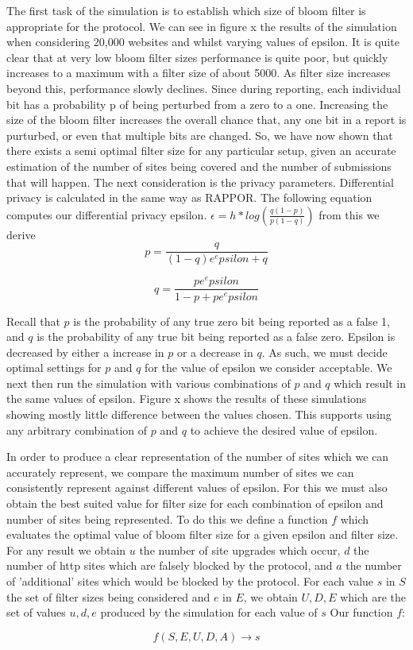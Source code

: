 \documentclass[11pt]{article}
\begin{document}
The first task of the simulation is to establish which size of bloom filter is appropriate for the protocol. We can see in figure x the results of the simulation when considering 20,000 websites and whilst varying values of epsilon. It is quite clear that at very low bloom filter sizes performance is quite poor, but quickly increases to a maximum with a filter size of about 5000. As filter size increases beyond this, performance slowly declines. Since during reporting, each individual bit has a probability p of being perturbed from a zero to a one. Increasing the size of the bloom filter increases the overall chance that, any one bit in a report is purturbed, or even that multiple bits are changed. So, we have now shown that there exists a semi optimal filter size for any particular setup, given an accurate estimation of the number of sites being covered and the number of submissions that will happen. The next consideration is the privacy parameters. Differential privacy is calculated in the same way as RAPPOR. The following equation computes our differential privacy epsilon. \(\epsilon = h * log(\frac{q(1-p)}{p(1-q)})\) from this we derive $$p = \frac{q}{(1-q)e^epsilon + q}$$

$$q = \frac{p e^epsilon}{1-p+pe^epsilon}$$

Recall that \(p\) is the probability of any true zero bit being reported as a false 1, and \(q\) is the probability of any true bit being reported as a false zero. Epsilon is decreased by either a increase in \(p\) or a decrease in \(q\). As such, we must decide optimal settings for \(p\) and \(q\) for the value of epsilon we consider acceptable. We next then run the simulation with various combinations of \(p\) and \(q\) which result in the same values of epsilon. Figure x shows the results of these simulations showing mostly little difference between the values chosen. This supports using any arbitrary combination of \(p\) and \(q\) to achieve the desired value of epsilon.

In order to produce a clear representation of the number of sites which we can accurately represent, we compare the maximum number of sites we can consistently represent against different values of epsilon. For this we must also obtain the best suited value for filter size for each combination of epsilon and number of sites being represented. To do this we define a function \(f\) which evaluates the optimal value of bloom filter size for a given epsilon and filter size. For any result we obtain \(u\) the number of site upgrades which occur, \(d\) the number of http sites which are falsely blocked by the protocol, and \(a\) the number of 'additional' sites which would be blocked by the protocol.
For each value \(s\) in \(S\) the set of filter sizes being considered and \(e\) in \(E\), we obtain \(U,D,E\) which are the set of values \(u,d,e\) produced by the simulation for each value of \(s\)
Our function \(f\):

$$f(S,E,U,D,A) \to s$$
\end{document}
